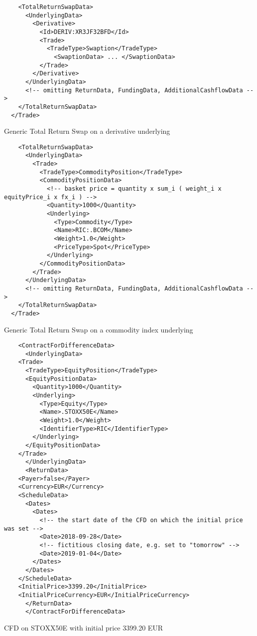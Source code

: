 \begin{listing}[H]
\begin{verbatim}
    <TotalReturnSwapData>
      <UnderlyingData>
        <Derivative>
          <Id>DERIV:XR3JF32BFD</Id>
          <Trade>
            <TradeType>Swaption</TradeType>
              <SwaptionData> ... </SwaptionData>
          </Trade>
        </Derivative>
      </UnderlyingData>
      <!-- omitting ReturnData, FundingData, AdditionalCashflowData -->
    </TotalReturnSwapData>
  </Trade>
\end{verbatim}
\caption{Generic Total Return Swap on a derivative underlying}
\label{lst:trsdata4}
\end{listing}

\begin{listing}[H]
\begin{verbatim}
    <TotalReturnSwapData>
      <UnderlyingData>
        <Trade>
          <TradeType>CommodityPosition</TradeType>
          <CommodityPositionData>
            <!-- basket price = quantity x sum_i ( weight_i x equityPrice_i x fx_i ) -->
            <Quantity>1000</Quantity>
            <Underlying>
              <Type>Commodity</Type>
              <Name>RIC:.BCOM</Name>
              <Weight>1.0</Weight>
              <PriceType>Spot</PriceType>
            </Underlying>
          </CommodityPositionData>
        </Trade>
      </UnderlyingData>
      <!-- omitting ReturnData, FundingData, AdditionalCashflowData -->
    </TotalReturnSwapData>
  </Trade>
\end{verbatim}
\caption{Generic Total Return Swap on a commodity index underlying}
\label{lst:trsdata5}
\end{listing}

\begin{listing}[H]
\begin{verbatim}
    <ContractForDifferenceData>
      <UnderlyingData>
	<Trade>
	  <TradeType>EquityPosition</TradeType>
	  <EquityPositionData>
	    <Quantity>1000</Quantity>
	    <Underlying>
	      <Type>Equity</Type>
	      <Name>.STOXX50E</Name>
	      <Weight>1.0</Weight>
	      <IdentifierType>RIC</IdentifierType>
	    </Underlying>
	  </EquityPositionData>
	</Trade>
      </UnderlyingData>
      <ReturnData>
	<Payer>false</Payer>
	<Currency>EUR</Currency>
	<ScheduleData>
	  <Dates>
	    <Dates>
	      <!-- the start date of the CFD on which the initial price was set -->
	      <Date>2018-09-28</Date>
	      <!-- fictitious closing date, e.g. set to "tomorrow" -->
	      <Date>2019-01-04</Date>
	    </Dates>
	  </Dates>
	</ScheduleData>
	<InitialPrice>3399.20</InitialPrice>
	<InitialPriceCurrency>EUR</InitialPriceCurrency>
      </ReturnData>
      </ContractForDifferenceData>
\end{verbatim}
\caption{CFD on STOXX50E with initial price 3399.20 EUR}
\label{lst:trsdata_cfd}
\end{listing}
